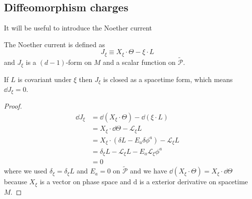 \documentclass[10pt]{article}
\begin{document}
\subsection{Diffeomorphism charges}

It will be useful to introduce the Noether current\cite{Iyer:1994ys}
\begin{definition}
    The Noether current is defined as
    \begin{equation}
        J_\xi\equiv X_\xi\cdot\Theta-\xi\cdot L
    \end{equation}
    and $J_\xi$ is a $(d-1)$-form on $M$ and a scalar function on $\widetilde{\mathcal{P}}$.
\end{definition}

\begin{claim}
    If $L$ is covariant under $\xi$ then $J_{\xi}$ is closed as a spacetime form, which means $\dd{J_\xi}=0$.
\end{claim}
\begin{proof}
    \begin{equation}
        \begin{split}
            \dd{J_\xi}&=\dd{(X_\xi\cdot\Theta)}-\dd{(\xi\cdot L)}\\
                      &=X_\xi\cdot\dd{\Theta}-\mathcal{L}_\xi L\\
                      &=X_{\xi}\cdot\left(\delta L-E_a\delta\phi^a\right)-\mathcal{L}_\xi L\\
                      &=\delta_\xi L-\mathcal{L}_\xi L-E_a\mathcal{L}_\xi \phi^a\\
                      &=0
        \end{split}
    \end{equation}
    where we used $\delta_\xi=\delta_\xi L$ and $E_a=0$ on $\widetilde{\mathcal{P}}$ and we have $\dd{(X_\xi\cdot\Theta)}=X_\xi\cdot\dd{\Theta}$ because $X_\xi$ is a vector on phase space and $\mathrm{d}$ is a exterior derivative on spacetime $M$.
\end{proof}
\end{document}
